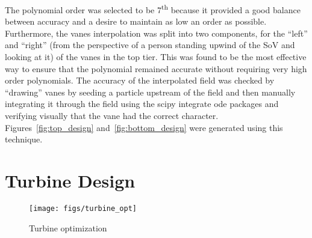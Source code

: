 The polynomial order was selected to be 7\textsuperscript{th} because it
provided a good balance between accuracy and a desire to maintain as low
an order as possible. Furthermore, the vanes interpolation was split
into two components, for the ``left'' and ``right'' (from the perspective of a
person standing upwind of the SoV and looking at it) of the vanes in the
top tier. This was found to be the most effective way to ensure that the
polynomial remained accurate without requiring very high order
polynomials. The accuracy of the interpolated field was checked by
``drawing'' vanes by seeding a particle upstream of the field and then
manually integrating it through the field using the scipy integrate ode
packages and verifying visually that the vane had the correct
character. Figures~\ref{fig:top_design} and~\ref{fig:bottom_design} were
generated using this technique. 

%
%

\section{Turbine Design}
\label{sec:turb_design}

  \begin{figure}[!htb]
   \begin{center}
    \texttt{[image: figs/turbine\_opt]}
    \caption{Turbine optimization}
    \label{fig:ut_turbine}
   \end{center}
  \end{figure}

